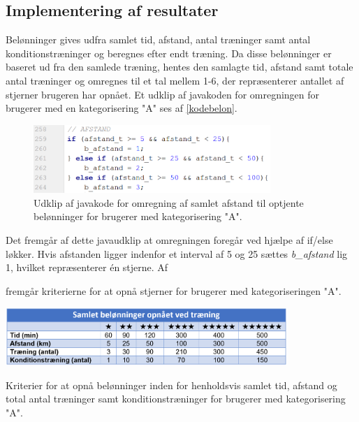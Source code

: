 \subsection{Implementering af resultater}
Belønninger gives udfra samlet tid, afstand, antal træninger samt antal konditionstræninger og beregnes efter endt træning. Da disse belønninger er baseret ud fra den samlede træning, hentes den samlagte tid, afstand samt totale antal træninger og omregnes til et tal mellem 1-6, der repræsenterer antallet af stjerner brugeren har opnået. Et udklip af javakoden for omregningen for brugerer med en kategorisering "A" ses af \autoref{kodebelon}.

\begin{figure} [H]
\centering
\includegraphics[width=0.8\textwidth]{figures/imple/kodebelon}
\caption{Udklip af javakode for omregning af samlet afstand til optjente belønninger for brugerer med kategorisering "A".}
\label{fig:kodebelon}
\end{figure} 

\noindent
Det fremgår af dette javaudklip at omregningen foregår ved hjælpe af if/else løkker. Hvis afstanden ligger indenfor et interval af 5 og 25 sættes \textit{b\_afstand} lig 1, hvilket repræsenterer én stjerne. Af \author{tab:SamletBelon} fremgår kriterierne for at opnå stjerner for brugerer med kategoriseringen "A".  

\begin{table}[H]
\centering
\includegraphics[width=0.8\textwidth]{figures/imple/SamletBelon}
\caption{Kriterier for at opnå belønninger inden for henholdsvis samlet tid, afstand og total antal træninger samt konditionstræninger for brugerer med kategorisering "A".}
\label{tab:SamletBelon}
\end{table}  
